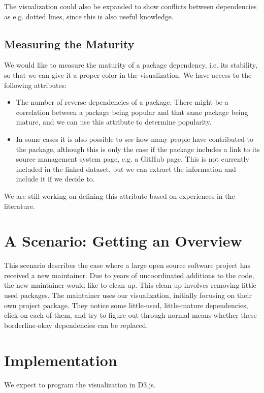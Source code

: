 \documentclass[a4paper,12pt]{article}
\begin{document}
The visualization could also be expanded to show conflicts between dependencies
as e.g. dotted lines, since this is also useful knowledge.

\subsection{Measuring the Maturity}

We would like to measure the maturity of a package dependency, i.e. its
stability, so that we can give it a proper color in the visualization.  We have
access to the following attributes:

\begin{itemize}
\item The number of reverse dependencies of a package.  There might be a
correlation between a package being popular and that same package being mature,
and we can use this attribute to determine popularity.
\item In some cases it is also possible to see how many people have contributed
to the package, although this is only the case if the package includes a link to
its source management system page, e.g. a GitHub page.  This is not currently
included in the linked dataset, but we can extract the information and include
it if we decide to.
\end{itemize}

We are still working on defining this attribute based on experiences in the
literature.


\section{A Scenario: Getting an Overview}

This scenario describes the case where a large open source software project has
received a new maintainer.  Due to years of uncoordinated additions to the code,
the new maintainer would like to clean up.  This clean up involves removing
little-used packages.  The maintainer uses our visualization, initially focusing
on their own project package.  They notice some little-used, little-mature
dependencies, click on each of them, and try to figure out through normal means
whether these borderline-okay dependencies can be replaced.


\section{Implementation}

We expect to program the visualization in D3.js.
\end{document}
